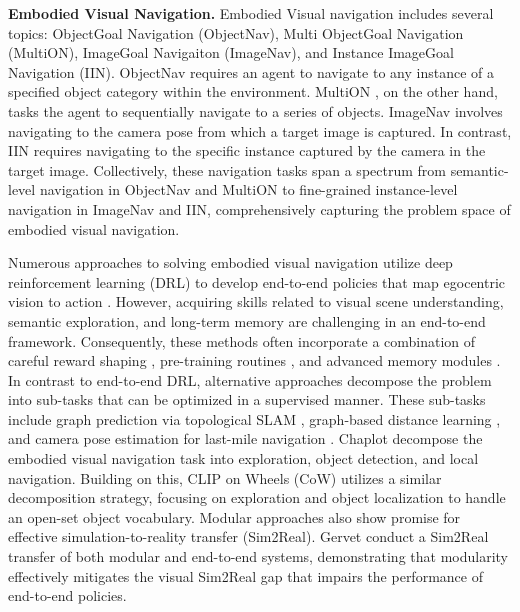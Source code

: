 \textbf{Embodied Visual Navigation.} Embodied Visual navigation includes several topics: ObjectGoal Navigation (ObjectNav), Multi ObjectGoal Navigation (MultiON), ImageGoal Navigaiton (ImageNav), and Instance ImageGoal Navigation (IIN). ObjectNav \cite{majumdar2022zson, chaplot2020object, wang2024find, chang2020semantic, chaplot2021seal} requires an agent to navigate to any instance of a specified object category within the environment. MultiON \cite{chen2022learning, wani2020multion, schmalstieg2022learning, marza2023multi}, on the other hand, tasks the agent to sequentially navigate to a series of objects. ImageNav \cite{al2022zero, choi2021image, yadav2023ovrl, yadav2023offline, Kwon_2023_CVPR,Chaplot_2020_CVPR,savinov2018semi,TSGM, wasserman2022lastmile} involves navigating to the camera pose from which a target image is captured. In contrast, IIN \cite{krantz2023navigating, bono2023endtoend, lei2024instanceaware} requires navigating to the specific instance captured by the camera in the target image. Collectively, these navigation tasks span a spectrum from semantic-level navigation in ObjectNav and MultiON to fine-grained instance-level navigation in ImageNav and IIN, comprehensively capturing the problem space of embodied visual navigation. 

Numerous approaches to solving embodied visual navigation utilize deep reinforcement learning (DRL) to develop end-to-end policies that map egocentric vision to action \cite{al2022zero, majumdar2022zson, yadav2023offline, zhu2017target}. However, acquiring skills related to visual scene understanding, semantic exploration, and long-term memory are challenging in an end-to-end framework. Consequently, these methods often incorporate a combination of careful reward shaping \cite{choi2021image}, pre-training routines \cite{yadav2023offline}, and advanced memory modules \cite{savinov2018semi, mezghan2022memory, wu2019bayesian}. In contrast to end-to-end DRL, alternative approaches decompose the problem into sub-tasks that can be optimized in a supervised manner. These sub-tasks include graph prediction via topological SLAM \cite{Chaplot_2020_CVPR}, graph-based distance learning \cite{hahn2021no, shah2021rapid}, and camera pose estimation for last-mile navigation \cite{wasserman2022lastmile}. Chaplot \etal \cite{chaplot2020object} decompose the embodied visual navigation task into exploration, object detection, and local navigation. Building on this, CLIP on Wheels (CoW) \cite{gadre2023cows} utilizes a similar decomposition strategy, focusing on exploration and object localization to handle an open-set object vocabulary. Modular approaches also show promise for effective simulation-to-reality transfer (Sim2Real). Gervet \etal \cite{gervet2023navigating} conduct a Sim2Real transfer of both modular and end-to-end systems, demonstrating that modularity effectively mitigates the visual Sim2Real gap that impairs the performance of end-to-end policies. 

